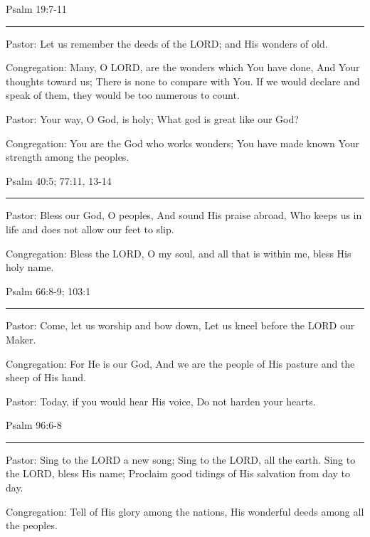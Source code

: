 \documentclass[]{book}
\begin{document}
Psalm 19:7-11 \textbar{}

\begin{center}\rule{0.5\linewidth}{\linethickness}\end{center}

Pastor: Let us remember the deeds of the LORD; and His wonders of old.

Congregation: Many, O LORD, are the wonders which You have done, And Your thoughts toward us; There is none to compare with You. If we would declare and speak of them, they would be too numerous to count.

Pastor: Your way, O God, is holy; What god is great like our God?

Congregation: You are the God who works wonders; You have made known Your strength among the peoples.

Psalm 40:5; 77:11, 13-14 \textbar{}

\begin{center}\rule{0.5\linewidth}{\linethickness}\end{center}

Pastor: Bless our God, O peoples, And sound His praise abroad, Who keeps us in life and does not allow our feet to slip.

Congregation: Bless the LORD, O my soul, and all that is within me, bless His holy name.

Psalm 66:8-9; 103:1 \textbar{}

\begin{center}\rule{0.5\linewidth}{\linethickness}\end{center}

Pastor: Come, let us worship and bow down, Let us kneel before the LORD our Maker.

Congregation: For He is our God, And we are the people of His pasture and the sheep of His hand.

Pastor: Today, if you would hear His voice, Do not harden your hearts.

Psalm 96:6-8 \textbar{}

\begin{center}\rule{0.5\linewidth}{\linethickness}\end{center}

Pastor: Sing to the LORD a new song; Sing to the LORD, all the earth. Sing to the LORD, bless His name; Proclaim good tidings of His salvation from day to day.

Congregation: Tell of His glory among the nations, His wonderful deeds among all the peoples.
\end{document}
